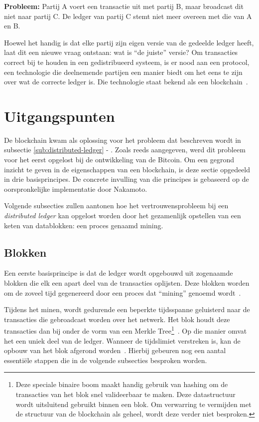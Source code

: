 \textbf{Probleem:} Partij A voert een transactie uit met partij B, maar broadcast dit niet naar partij C. De ledger van partij C stemt niet meer overeen met die van A en B.

Hoewel het handig is dat elke partij zijn eigen versie van de gedeelde ledger heeft, laat dit een nieuwe vraag ontstaan: wat is ``de juiste'' versie? Om transacties correct bij te houden in een gedistribueerd systeem, is er nood aan een protocol, een technologie die deelnemende partijen een manier biedt om het eens te zijn over wat de correcte ledger is. Die technologie staat bekend als een blockchain~\autocite{Chaudhry2018}.


\section{Uitgangspunten}
\label{sec:uitgangspunten}

De blockchain kwam als oplossing voor het probleem dat beschreven wordt in subsectie \ref{sub:distributed-ledger} - . Zoals reeds aangegeven, werd dit probleem voor het eerst opgelost bij de ontwikkeling van de Bitcoin. Om een gegrond inzicht te geven in de eigenschappen van een blockchain, is deze sectie opgedeeld in drie basisprincipes. De concrete invulling van die principes is gebaseerd op de oorspronkelijke implementatie door Nakamoto.

Volgende subsecties zullen aantonen hoe het vertrouwensprobleem bij een \textit{distributed ledger} kan opgelost worden door het gezamenlijk opstellen van een keten van datablokken: een proces genaamd mining.


\subsection{Blokken}
\label{sub:blokken}

Een eerste basisprincipe is dat de ledger wordt opgebouwd uit zogenaamde blokken die elk een apart deel van de transacties oplijsten. Deze blokken worden om de zoveel tijd gegenereerd door een proces dat ``mining'' genoemd wordt~\autocite{Bhaskar2015}.

Tijdens het minen, wordt gedurende een beperkte tijdsspanne geluisterd naar de transacties die gebroadcast worden over het netwerk. Het blok houdt deze transacties dan bij onder de vorm van een Merkle Tree\footnote{Deze speciale binaire boom maakt handig gebruik van hashing om de transacties van het blok snel valideerbaar te maken. Deze datastructuur wordt uitsluitend gebruikt binnen een blok. Om verwarring te vermijden met de structuur van de blockchain als geheel, wordt deze verder niet besproken.}~\autocite{Salem2008}. Op die manier omvat het een uniek deel van de ledger. Wanneer de tijdslimiet verstreken is, kan de opbouw van het blok afgerond worden~\autocite{Nakamoto2008}. Hierbij gebeuren nog een aantal essentiële stappen die in de volgende subsecties besproken worden. 

